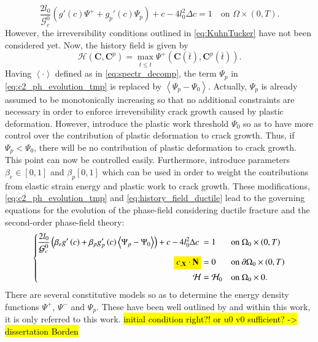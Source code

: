 \begin{equation} \label{eq:c2_ph_evolution_tmp}
\dfrac{2l_{0}}{\mathcal{G}_{c}^{0}}\left(g'\left(c\right)\Psi^{+}+g_{p}'\left(c\right)\Psi_{p}\right) + c - 4l_{0}^{2}\Delta c = 1 \quad\text{on } \Omega\times\left(0,T\right).
\end{equation}
However, the irreversibility conditions outlined in \eqref{eq:KuhnTucker} have not been considered yet. Now, the history field is given by
\begin{equation} \label{eq:history_field_ductile}
	\mathcal{H}\left(\mathbf{C},\mathbf{C}^{p}\right) = \max\limits_{\bar{t}\leq t} \Psi^{+}\left(\mathbf{C}\left(\bar{t}\right),\mathbf{C}^{p}\left(\bar{t}\right)\right).
\end{equation}
Having $\left<\cdot\right>$ defined as in \eqref{eq:spectr_decomp}, the term $\Psi_{p}$ in \eqref{eq:c2_ph_evolution_tmp} is replaced by $\left<\Psi_{p}-\Psi_{0}\right>$. Actually, $\Psi_{p}$ is already assumed to be monotonically increasing so that no additional constraints are necessary in order to enforce irreversibility crack growth caused by plastic deformation. However, \citet{03_PF_ductile} introduce the plastic work threshold $\Psi_{0}$ so as to have more control over the contribution of plastic deformation to crack growth. Thus, if $\Psi_{p}<\Psi_{0}$, there will be no contribution of plastic deformation to crack growth. This point can now be controlled easily. Furthermore, \citet{03_PF_ductile} introduce parameters $\beta_{e}\in\left[0,1\right]$ and $\beta_{p}\left[0,1\right]$ which can be used in order to weight the contributions from elastic strain energy and plastic work to crack growth. These modifications, \eqref{eq:c2_ph_evolution_tmp} and \eqref{eq:history_field_ductile} lead to the governing equations for the evolution of the phase-field considering ductile fracture and the second-order phase-field theory:
\begin{equation} \label{eq:c2_equil_ductile}
	\left\{\begin{alignedat}{2}
		\dfrac{2l_{0}}{\mathcal{G}_{c}^{0}}\left(\beta_{e}g'\left(c\right)+\beta_{p}g_{p}'\left(c\right)\left<\Psi_{p}-\Psi_{0}\right>\right) + c - 4l_{0}^{2}\Delta c\ &= 1 && \quad\text{on } \Omega_{0}\times\left(0,T\right) \\
		\hl{c_{,\mathbf{X}}\cdot\mathbf{N}} &= 0 && \quad \text{on } \partial\Omega_{0}\times\left(0,T\right) \\
		\mathcal{H} &= \mathcal{H}_{0} && \quad \text{on } \Omega_{0}\times0.
	\end{alignedat}\right.
\end{equation}
There are several constitutive models so as to determine the energy density functions $\Psi^{+}$, $\Psi^{-}$ and $\Psi_{p}$. These have been well outlined by \citet{03_PF_ductile} and within this work, it is only referred to this work. \hl{initial condition right?! or u0 v0 sufficient? -> dissertation Borden}

